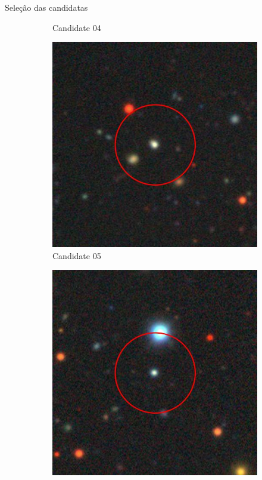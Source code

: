 \begin{frame}[c]{Seleção das candidatas}
\begin{figure}[]
\begin{subfigure}[b]{0.13\textwidth}
            \caption{Candidate 04}
        \end{subfigure}
        \begin{subfigure}[b]{0.13\textwidth}
            \includegraphics[width=\textwidth]{images/candidata_final/05.jpg}
            \caption{Candidate 05}
        \end{subfigure}
        \begin{subfigure}[b]{0.13\textwidth}
            \includegraphics[width=\textwidth]{images/candidata_final/06.jpg}

\end{subfigure}
\end{figure}
\end{frame}
